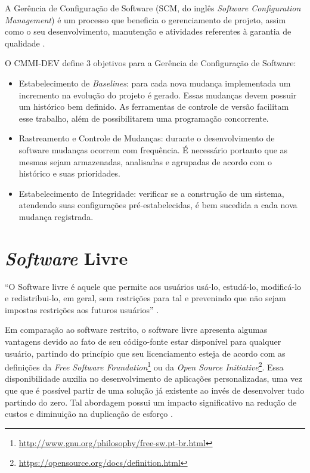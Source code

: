 A Gerência de Configuração de Software (SCM, do inglês \textit{Software Configuration Management}) é um processo que beneficia o gerenciamento de projeto, assim como o seu desenvolvimento, manutenção e atividades referentes à garantia de qualidade \cite{SWEBOK2014}.

O CMMI-DEV \cite{cmmi_dev} define 3 objetivos para a Gerência de Configuração de Software:
\begin{itemize}
    \item Estabelecimento de \textit{Baselines}: para cada nova mudança implementada um incremento na evolução do projeto é gerado. Essas mudanças devem possuir um histórico bem definido. As ferramentas de controle de versão facilitam esse trabalho, além de possibilitarem uma programação concorrente.
    \item Rastreamento e Controle de Mudanças: durante o desenvolvimento de software mudanças ocorrem com frequência. É necessário portanto que as mesmas sejam armazenadas, analisadas e agrupadas de acordo com o histórico e suas prioridades.
    \item Estabelecimento de Integridade: verificar se a construção de um sistema, atendendo suas configurações pré-estabelecidas, é bem sucedida a cada nova mudança registrada.
\end{itemize}

\section{\textit{Software} Livre}
``O Software livre é aquele que permite aos usuários usá-lo, estudá-lo, modificá-lo e redistribui-lo, em geral, sem restrições para tal e prevenindo que não sejam impostas restrições aos futuros usuários'' \cite{meirelles2013}.

Em comparação ao software restrito, o software livre apresenta algumas vantagens devido ao fato de seu código-fonte estar disponível para qualquer usuário, partindo do princípio que seu licenciamento esteja de acordo com as definições da \textit{Free Software Foundation}\footnote{\url{http://www.gnu.org/philosophy/free-sw.pt-br.html}} ou da \textit{Open Source Initiative}\footnote{\url{https://opensource.org/docs/definition.html}}. Essa disponibilidade auxilia no desenvolvimento de aplicações personalizadas, uma vez que que é possível partir de uma solução já existente ao invés de desenvolver tudo partindo do zero. Tal abordagem possui um impacto significativo na redução de custos e diminuição na duplicação de esforço \cite{meirelles2013}.

